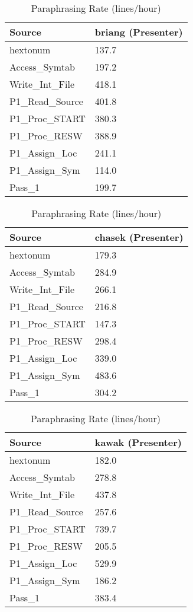 \begin{table}[hb]
\begin{center}
\begin{tabular}{|l|l|}
\hline
Source & briang (Presenter)\\
\hline
hextonum & 137.7\\
Access\_Symtab & 197.2\\
Write\_Int\_File & 418.1\\
P1\_Read\_Source & 401.8\\
P1\_Proc\_START & 380.3\\
P1\_Proc\_RESW & 388.9\\
P1\_Assign\_Loc & 241.1\\
P1\_Assign\_Sym & 114.0\\
Pass\_1 & 199.7\\
\hline
\end{tabular}
\end{center}
\caption{Paraphrasing Rate (lines/hour)}
\end{table}


\begin{table}[hb]
\begin{center}
\begin{tabular}{|l|l|}
\hline
Source & chasek (Presenter)\\
\hline
hextonum & 179.3\\
Access\_Symtab & 284.9\\
Write\_Int\_File & 266.1\\
P1\_Read\_Source & 216.8\\
P1\_Proc\_START & 147.3\\
P1\_Proc\_RESW & 298.4\\
P1\_Assign\_Loc & 339.0\\
P1\_Assign\_Sym & 483.6\\
Pass\_1 & 304.2\\
\hline
\end{tabular}
\end{center}
\caption{Paraphrasing Rate (lines/hour)}
\end{table}

\begin{table}[hb]
\begin{center}
\begin{tabular}{|l|l|}
\hline
Source & kawak (Presenter)\\
\hline
hextonum & 182.0\\
Access\_Symtab & 278.8\\
Write\_Int\_File & 437.8\\
P1\_Read\_Source & 257.6\\
P1\_Proc\_START & 739.7\\
P1\_Proc\_RESW & 205.5\\
P1\_Assign\_Loc & 529.9\\
P1\_Assign\_Sym & 186.2\\
Pass\_1 & 383.4\\
\hline
\end{tabular}
\end{center}
\caption{Paraphrasing Rate (lines/hour)}
\end{table}

